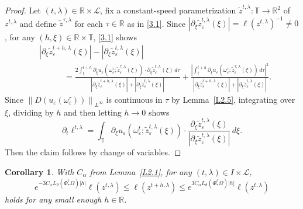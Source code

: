 \documentclass[reqno,centertags,12pt]{amsart}
\newtheorem{corollary}[theorem]{Corollary}
\theoremstyle{definition}
\numberwithin{equation}{section}
\newcommand{\abs}[1]{\left\lvert#1\right\rvert}
\newcommand{\norm}[1]{\left\|#1\right\|}
\newcommand{\bbR}{{\mathbb{R}}}
\newcommand{\bbT}{{\mathbb{T}}}
\newcommand{\eps}{\varepsilon}
\newcommand{\tht}{\theta}
\begin{document}
\begin{proof}
    Let $(t,\lambda)\in\bbR\times\mathcal{L}$, fix a constant-speed parametrization
    $\tilde{z}^{t,\lambda}\colon\bbT\to\bbR^{2}$ of $z^{t,\lambda}$
    and define $\tilde{z}^{\tau,\lambda}$ for each $\tau\in\bbR$ as in \eqref{3.1}.
    Since $\abs{\partial_{\xi}\tilde{z}_{\eps}^{t,\lambda}(\xi)}
    = \ell(z^{t,\lambda})^{-1} \neq 0$, for any $(h,\xi)\in\bbR\times\bbT$, \eqref{3.1} shows
    \begin{equation*}
        \begin{aligned}
            &\abs{\partial_{\xi}\tilde{z}_{\eps}^{t+h,\lambda}(\xi)}
            - \abs{\partial_{\xi}\tilde{z}_{\eps}^{t,\lambda}(\xi)}
            \\&\quad\quad\quad
            = \frac{2\int_{t}^{t+h}\partial_{\xi}u_{\eps}(\omega_{\eps}^{\tau};
            \tilde{z}_{\eps}^{\tau,\lambda}(\xi))
            \cdot \partial_{\xi}\tilde{z}_{\eps}^{t,\lambda}(\xi)\,d\tau}
            {\abs{\partial_{\xi}\tilde{z}_{\eps}^{t+h,\lambda}(\xi)}
            + \abs{\partial_{\xi}\tilde{z}_{\eps}^{t,\lambda}(\xi)}}
            + \frac{\abs{\int_{t}^{t+h}\partial_{\xi}u_{\eps}(\omega_{\eps}^{\tau};
            \tilde{z}_{\eps}^{\tau,\lambda}(\xi))\,d\tau}^{2}}
            {\abs{\partial_{\xi}\tilde{z}_{\eps}^{t+h,\lambda}(\xi)}
            + \abs{\partial_{\xi}\tilde{z}_{\eps}^{t,\lambda}(\xi)}}.
        \end{aligned}
    \end{equation*}
    Since $\norm{D(u_{\eps}(\omega_{\eps}^{\tau}))}_{L^{\infty}}$ is continuous in $\tau$
    by Lemma~\ref{L2.5}, integrating over $\xi$, dividing by $h$
    and then letting $h\to 0$ shows
    \[
        \partial_{t}\ell^{t,\lambda}
        = \int_{\bbT}
        \partial_{\xi}u_{\eps}(\omega_{\eps}^{t};\tilde{z}_{\eps}^{t,\lambda}(\xi))
        \cdot \frac{\partial_{\xi}\tilde{z}_{\eps}^{t,\lambda}(\xi)}
        {\abs{\partial_{\xi}\tilde{z}_{\eps}^{t,\lambda}(\xi)}}\,d\xi.
    \]
    Then the claim follows by change of variables.
\end{proof}

\begin{corollary}\label{C3.2}
    With $C_{\alpha}$ from Lemma~\ref{L2.1}, for any $(t,\lambda)\in I\times\mathcal{L}$,
    \[
        e^{-3C_{\alpha}L_{\tht}(\Phi_{*}^{t}\Omega)\abs{h}}\ell(z^{t,\lambda})
        \leq \ell(z^{t+h,\lambda}) \leq
        e^{3C_{\alpha}L_{\tht}(\Phi_{*}^{t}\Omega)\abs{h}}\ell(z^{t,\lambda})
    \]
    holds for any small enough $h\in\bbR$.
\end{corollary}
\end{document}
